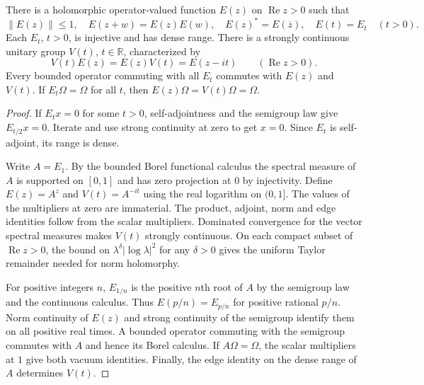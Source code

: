 \begin{proposition}\label{prop:complex-heat}
There is a holomorphic operator-valued function $E(z)$ on
$\operatorname{Re}z>0$ such that
\[
 \|E(z)\|\leq1,\quad E(z+w)=E(z)E(w),\quad
 E(z)^*=E(\overline z),\quad E(t)=E_t\quad(t>0).
\]
Each $E_t$, $t>0$, is injective and has dense range. There is a strongly
continuous unitary group $V(t)$, $t\in\mathbb R$, characterized by
\begin{equation}\label{eq:complex-heat-edge}
 V(t)E(z)=E(z)V(t)=E(z-it)\qquad(\operatorname{Re}z>0).
\end{equation}
Every bounded operator commuting with all $E_t$ commutes with $E(z)$ and
$V(t)$. If $E_t\Omega=\Omega$ for all $t$, then
$E(z)\Omega=V(t)\Omega=\Omega$.
\end{proposition}
\begin{proof}
If $E_tx=0$ for some $t>0$, self-adjointness and the semigroup law
give $E_{t/2}x=0$. Iterate and use strong continuity at zero to get
$x=0$. Since $E_t$ is self-adjoint, its range is dense.

Write $A=E_1$. By the bounded Borel functional calculus
\cite[Theorem~VII.2]{ReedSimonI} the spectral measure of $A$ is
supported on $[0,1]$ and has zero projection at $0$ by injectivity.
Define $E(z)=A^z$ and $V(t)=A^{-it}$ using the real logarithm on
$(0,1]$. The values of the multipliers at zero are immaterial.
The product, adjoint, norm and edge identities follow from the
scalar multipliers. Dominated convergence for the vector spectral
measures makes $V(t)$ strongly continuous. On each compact
subset of $\operatorname{Re}z>0$, the bound on
$\lambda^\delta|\log\lambda|^2$ for any $\delta>0$ gives the
uniform Taylor remainder needed for norm holomorphy.

For positive integers $n$, $E_{1/n}$ is the positive $n$th root of
$A$ by the semigroup law and the continuous calculus. Thus
$E(p/n)=E_{p/n}$ for positive rational $p/n$. Norm continuity of
$E(z)$ and strong continuity of the semigroup identify them on
all positive real times. A bounded operator commuting with the
semigroup commutes with $A$ and hence its Borel calculus. If
$A\Omega=\Omega$, the scalar multipliers at $1$ give both vacuum
identities. Finally, the edge identity on the dense range of $A$
determines $V(t)$.
\end{proof}


